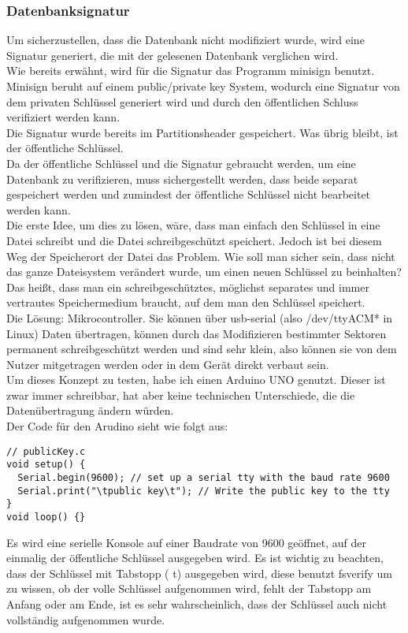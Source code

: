 \subsubsection{Datenbanksignatur}
Um sicherzustellen, dass die Datenbank nicht modifiziert wurde, wird eine Signatur generiert, die mit der gelesenen Datenbank verglichen wird.\\
Wie bereits erwähnt, wird für die Signatur das Programm minisign benutzt. Minisign beruht auf einem public/private key System, wodurch eine Signatur von dem privaten Schlüssel generiert wird und durch den öffentlichen Schluss verifiziert werden kann.\\
Die Signatur wurde bereits im Partitionsheader gespeichert. Was übrig bleibt, ist der öffentliche Schlüssel.\\
Da der öffentliche Schlüssel und die Signatur gebraucht werden, um eine Datenbank zu verifizieren, muss sichergestellt werden, dass beide separat gespeichert werden und zumindest der öffentliche Schlüssel nicht bearbeitet werden kann.\\
Die erste Idee, um dies zu lösen, wäre, dass man einfach den Schlüssel in eine Datei schreibt und die Datei schreibgeschützt speichert. Jedoch ist bei diesem Weg der Speicherort der Datei das Problem. Wie soll man sicher sein, dass nicht das ganze Dateisystem verändert wurde, um einen neuen Schlüssel zu beinhalten?
\bigbreak \noindent
Das heißt, dass man ein schreibgeschütztes, möglichst separates und immer vertrautes Speichermedium braucht, auf dem man den Schlüssel speichert.\\
Die Lösung: Mikrocontroller. Sie können über usb-serial (also /dev/ttyACM* in Linux) Daten übertragen, können durch das Modifizieren bestimmter Sektoren permanent schreibgeschützt werden und sind sehr klein, also können sie von dem Nutzer mitgetragen werden oder in dem Gerät direkt verbaut sein.
\\
Um dieses Konzept zu testen, habe ich einen Arduino UNO genutzt. Dieser ist zwar immer schreibbar, hat aber keine technischen Unterschiede, die die Datenübertragung ändern würden.
\\
Der Code für den Arudino sieht wie folgt aus:
\begin{verbatim}
// publicKey.c
void setup() {
  Serial.begin(9600); // set up a serial tty with the baud rate 9600
  Serial.print("\tpublic key\t"); // Write the public key to the tty
}
void loop() {}
\end{verbatim}

Es wird eine serielle Konsole auf einer Baudrate von 9600 geöffnet, auf der einmalig der öffentliche Schlüssel ausgegeben wird. Es ist wichtig zu beachten, dass der Schlüssel mit Tabstopp ( t) ausgegeben wird, diese benutzt fsverify um zu wissen, ob der volle Schlüssel aufgenommen wird, fehlt der Tabstopp am Anfang oder am Ende, ist es sehr wahrscheinlich, dass der Schlüssel auch nicht vollständig aufgenommen wurde.

